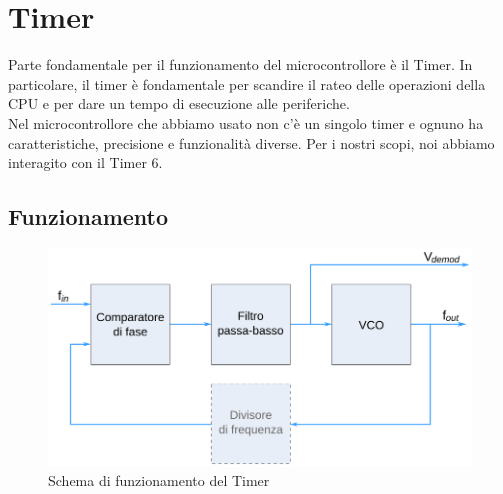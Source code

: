 \pagebreak
\section{Timer}
Parte fondamentale per il funzionamento del microcontrollore è il Timer. In particolare, il timer è fondamentale per scandire il rateo delle operazioni della CPU e per dare un tempo di esecuzione alle periferiche.\\

Nel microcontrollore che abbiamo usato non c'è un singolo timer e ognuno ha caratteristiche, precisione e funzionalità diverse. 
Per i nostri scopi, noi abbiamo interagito con il Timer 6.

\subsection{Funzionamento}

\begin{figure}[h]
    \centering
    \includegraphics[width=0.7\linewidth]{microcontrollore/assets/PLL1_it.png}
    \caption{Schema di funzionamento del Timer}
    \label{fig:Timer}
\end{figure}